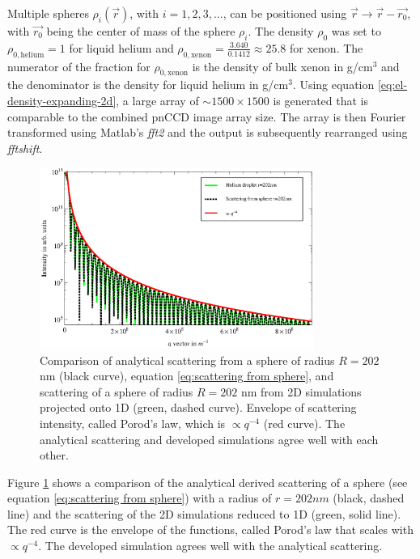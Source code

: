 Multiple spheres $\rho_{i}\left(\vec{r}\right)$, with $i=1,2,3,...$, can be positioned using $\vec{r}\rightarrow \vec{r}-\vec{r_{0}}$, with $\vec{r_{0}}$ being the center of mass of the sphere $\rho_{i}$. The density $\rho_{0}$ was set to $\rho_{0, \text{helium}}=1$ for liquid helium and $\rho_{0,\text{xenon}}=\frac{3.640}{0.1412}\approx 25.8$ for xenon. The numerator of the fraction for $\rho_{0,\text{xenon}}$ is the density of bulk xenon in g/cm$^{3}$ and the denominator is the density for liquid helium in g/cm$^{3}$. Using equation \eqref{eq:el-density-expanding-2d}, a large array of $\sim 1500\times 1500$ is generated that is comparable to the combined pnCCD image array size. The array is then Fourier transformed using Matlab's \textit{fft2} and the output is subsequently rearranged using \textit{fftshift}.\\
\begin{figure}
	\centering
		\includegraphics[width=0.80\textwidth]{images/cluster-sphere-intact.eps}
	\caption[Comparison of analytical derived scattering and numerical simulations.]{Comparison of analytical scattering from a sphere of radius $R=202$ nm (black curve), equation \ref{eq:scattering from sphere}, and scattering of a sphere of radius $R=202$ nm from 2D simulations projected onto 1D (green, dashed curve). Envelope of scattering intensity, called Porod's law, which is $\propto q^{-4}$ (red curve). The analytical scattering and developed simulations agree well with each other.}
	\label{fig:cluster-sphere-intact-2D}
\end{figure}
Figure \ref{fig:cluster-sphere-intact-2D} shows a comparison of the analytical derived scattering of a sphere (see equation \ref{eq:scattering from sphere}) with a radius of $r=202nm$ (black, dashed line) and the scattering of the 2D simulations reduced to 1D (green, solid line). The red curve is the envelope of the functions, called Porod's law that scales with $\propto q^{-4}$. The developed simulation agrees well with the analytical scattering.
%
%
%

